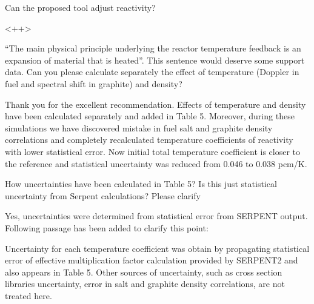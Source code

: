 \documentclass[answers,11pt]{exam}
\begin{document}
\begin{questions}
        \question Can the proposed tool adjust reactivity?
        \begin{solution}
                <++>
        \end{solution}


        \question ``The main physical principle underlying the reactor 
        temperature feedback is an expansion of material that is heated''. This 
        sentence would deserve some support data. Can you please calculate 
        separately the effect of temperature (Doppler in fuel and spectral 
        shift in graphite) and density?
        \begin{solution}
                Thank you for the excellent recommendation. Effects of temperature
                 and density have been calculated separately and added in Table 5.
                 Moreover, during these simulations we have discovered mistake in 
                 fuel salt and graphite density correlations and completely 
                 recalculated temperature coefficients of reactivity with lower 
                 statistical error. Now initial total temperature coefficient is 
                 closer to the reference and statistical uncertainty was reduced 
                 from 0.046 to 0.038 pcm/K.
        \end{solution}


        \question How uncertainties have been calculated in Table 5? Is this 
        just statistical uncertainty from Serpent calculations? Please clarify
        \begin{solution}
                Yes, uncertainties were determined from statistical error 
                from SERPENT output. Following passage has been added to clarify
                 this point:
                 
                 Uncertainty for each temperature coefficient was obtain by 
                 propagating statistical error of effective multiplication factor 
                 calculation provided by SERPENT2 and also appears in Table 5. 
                 Other sources of uncertainty, such as cross section libraries 
				 uncertainty, error in salt and graphite density correlations, 
				 are not treated here.
        \end{solution}


\end{questions}
\end{document}
